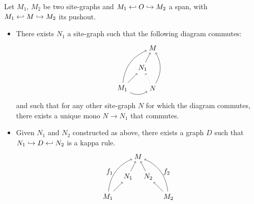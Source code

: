 \begin{lemma}
  \label{lem:inhibit_site}
  Let $M_1$, $M_2$ be two site-graphs and $M_1\hookleftarrow O\hookrightarrow M_2$ a span, with $M_1\hookleftarrow M\hookrightarrow M_2$ its pushout.
  \begin{itemize}
  \item
  There exists $N_1$ a site-graph such that the following diagram commutes:
  \[
  \begin{tikzpicture} %
    \node (m) at (1,2) {\(M\)};
    \node (m1) at (-0.5,0) {\(M_1\)};
    \node (n1) at (0.5,1) {\(N_1\)};
    \node (n) at (1,0) {\(N\)};
    \draw [->] (m1) to [bend left] (m);
    \draw [->] (m1) -- (n1);
    \draw [->] (n1) -- (m);
    \draw [->] (n) to [bend right] (m);
    \draw [->] (m1) to [bend right] (n);
    \draw [dotted,->] (n) -- (n1);
  \end{tikzpicture}
  \]
  and such that for any other site-graph $N$ for which the diagram commutes, there exists a unique mono $N\to N_1$ that commutes.
  \item Given $N_1$ and $N_2$ constructed as above, there exists a graph $D$ such that $N_1\hookrightarrow D\hookleftarrow N_2$ is a kappa rule.
  \[
  \begin{tikzpicture} %
    \node (m) at (1,2) {\(M\)};
    \node (m1) at (-0.5,0) {\(M_1\)};
    \node (n1) at (0.5,1) {\(N_1\)};
    \node (m2) at (2.5,0) {\(M_2\)};
    \node (n2) at (1.5,1) {\(N_2\)};
    \draw [->] (m1) to [bend left] node [left,midway]  {\(f_1\)} (m);
    \draw [->] (m1) -- (n1);
    \draw [->] (n1) -- (m);
    \draw [->] (m2) to [bend right] node [right,midway]  {\(f_2\)} (m);
    \draw [->] (m2) -- (n2);
    \draw [->] (n2) -- (m);
  \end{tikzpicture}
  \]
  \end{itemize}
\end{lemma}
